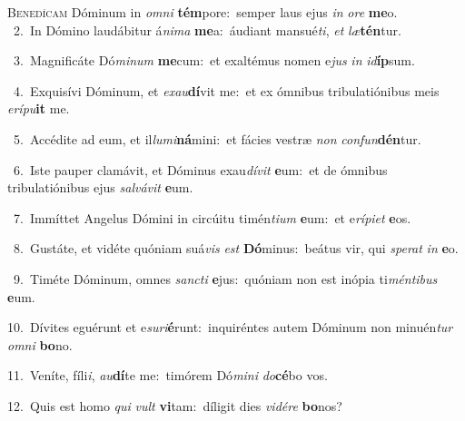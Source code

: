 \lettrine{\initial\textcolor{\initialcolor}{B}}{enedícam} Dóminum in \textit{om}\-\textit{ni} \textbf{tém}\-pore:~\star semper laus ejus \textit{in} \textit{o}\-\textit{re} \textbf{me}\-o.\\
{\numbfont\textcolor{\numbcolor}{~2.}}~In Dómino laudábitur á\-\textit{ni}\-\textit{ma} \textbf{me}\-a:~\star áudiant mansué\-\textit{ti}\-, \textit{et} \textit{læ}\-\textbf{tén}tur.\par
{\numbfont\textcolor{\numbcolor}{~3.}}~Magnificáte Dó\-\textit{mi}\-\textit{num} \textbf{me}\-cum:~\star et exaltémus nomen e\textit{jus} \textit{in} \textit{id}\-\textbf{íp}sum.\par
{\numbfont\textcolor{\numbcolor}{~4.}}~Exquisívi Dóminum, et \textit{ex}\-\textit{au}\textbf{dí}vit me:~\star et ex ómnibus tribulatiónibus meis \textit{e}\-\textit{rí}\textit{pu}\textbf{it} me.\par
{\numbfont\textcolor{\numbcolor}{~5.}}~Accédite ad eum, et il\-\textit{lu}\-\textit{mi}\textbf{ná}mini:~\star et fácies vestræ \textit{non} \textit{con}\-\textit{fun}\textbf{dén}tur.\par
{\numbfont\textcolor{\numbcolor}{~6.}}~Iste pauper clamávit, et Dóminus exau\-\textit{dí}\-\textit{vit} \textbf{e}\-um:~\star et de ómnibus tribulatiónibus ejus \textit{sal}\-\textit{vá}\textit{vit} \textbf{e}\-um.\par
{\numbfont\textcolor{\numbcolor}{~7.}}~Immíttet Angelus Dómini in circúitu timén\-\textit{ti}\-\textit{um} \textbf{e}\-um:~\star et e\-\textit{rí}\-\textit{pi}\textit{et} \textbf{e}\-os.\par
{\numbfont\textcolor{\numbcolor}{~8.}}~Gustáte, et vidéte quóniam suá\textit{vis} \textit{est} \textbf{Dó}\-minus:~\star beátus vir, qui \textit{spe}\-\textit{rat} \textit{in} \textbf{e}\-o.\par
{\numbfont\textcolor{\numbcolor}{~9.}}~Timéte Dóminum, omnes \textit{sanc}\-\textit{ti} \textbf{e}\-jus:~\star quóniam non est inópia ti\-\textit{mén}\-\textit{ti}\textit{bus} \textbf{e}\-um.\par
{\numbfont\textcolor{\numbcolor}{10.}}~Dívites eguérunt et e\-\textit{su}\-\textit{ri}\textbf{é}runt:~\star inquiréntes autem Dóminum non minuén\textit{tur} \textit{om}\-\textit{ni} \textbf{bo}\-no.\par
{\numbfont\textcolor{\numbcolor}{11.}}~Veníte, fíli\-\textit{i}\-, \textit{au}\-\textbf{dí}te me:~\star timórem Dó\-\textit{mi}\-\textit{ni} \textit{do}\-\textbf{cé}bo vos.\par
{\numbfont\textcolor{\numbcolor}{12.}}~Quis est homo \textit{qui} \textit{vult} \textbf{vi}\-tam:~\star díligit dies \textit{vi}\-\textit{dé}\textit{re} \textbf{bo}\-nos?\par

